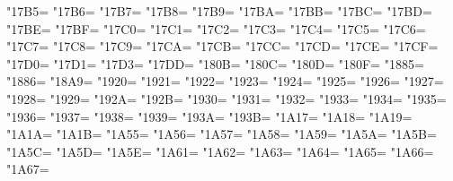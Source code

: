 \XeTeXcharclass"17B5=\KclassCM
\XeTeXcharclass"17B6=\KclassCM
\XeTeXcharclass"17B7=\KclassCM
\XeTeXcharclass"17B8=\KclassCM
\XeTeXcharclass"17B9=\KclassCM
\XeTeXcharclass"17BA=\KclassCM
\XeTeXcharclass"17BB=\KclassCM
\XeTeXcharclass"17BC=\KclassCM
\XeTeXcharclass"17BD=\KclassCM
\XeTeXcharclass"17BE=\KclassCM
\XeTeXcharclass"17BF=\KclassCM
\XeTeXcharclass"17C0=\KclassCM
\XeTeXcharclass"17C1=\KclassCM
\XeTeXcharclass"17C2=\KclassCM
\XeTeXcharclass"17C3=\KclassCM
\XeTeXcharclass"17C4=\KclassCM
\XeTeXcharclass"17C5=\KclassCM
\XeTeXcharclass"17C6=\KclassCM
\XeTeXcharclass"17C7=\KclassCM
\XeTeXcharclass"17C8=\KclassCM
\XeTeXcharclass"17C9=\KclassCM
\XeTeXcharclass"17CA=\KclassCM
\XeTeXcharclass"17CB=\KclassCM
\XeTeXcharclass"17CC=\KclassCM
\XeTeXcharclass"17CD=\KclassCM
\XeTeXcharclass"17CE=\KclassCM
\XeTeXcharclass"17CF=\KclassCM
\XeTeXcharclass"17D0=\KclassCM
\XeTeXcharclass"17D1=\KclassCM
\XeTeXcharclass"17D3=\KclassCM
\XeTeXcharclass"17DD=\KclassCM
\XeTeXcharclass"180B=\KclassCM
\XeTeXcharclass"180C=\KclassCM
\XeTeXcharclass"180D=\KclassCM
\XeTeXcharclass"180F=\KclassCM
\XeTeXcharclass"1885=\KclassCM
\XeTeXcharclass"1886=\KclassCM
\XeTeXcharclass"18A9=\KclassCM
\XeTeXcharclass"1920=\KclassCM
\XeTeXcharclass"1921=\KclassCM
\XeTeXcharclass"1922=\KclassCM
\XeTeXcharclass"1923=\KclassCM
\XeTeXcharclass"1924=\KclassCM
\XeTeXcharclass"1925=\KclassCM
\XeTeXcharclass"1926=\KclassCM
\XeTeXcharclass"1927=\KclassCM
\XeTeXcharclass"1928=\KclassCM
\XeTeXcharclass"1929=\KclassCM
\XeTeXcharclass"192A=\KclassCM
\XeTeXcharclass"192B=\KclassCM
\XeTeXcharclass"1930=\KclassCM
\XeTeXcharclass"1931=\KclassCM
\XeTeXcharclass"1932=\KclassCM
\XeTeXcharclass"1933=\KclassCM
\XeTeXcharclass"1934=\KclassCM
\XeTeXcharclass"1935=\KclassCM
\XeTeXcharclass"1936=\KclassCM
\XeTeXcharclass"1937=\KclassCM
\XeTeXcharclass"1938=\KclassCM
\XeTeXcharclass"1939=\KclassCM
\XeTeXcharclass"193A=\KclassCM
\XeTeXcharclass"193B=\KclassCM
\XeTeXcharclass"1A17=\KclassCM
\XeTeXcharclass"1A18=\KclassCM
\XeTeXcharclass"1A19=\KclassCM
\XeTeXcharclass"1A1A=\KclassCM
\XeTeXcharclass"1A1B=\KclassCM
\XeTeXcharclass"1A55=\KclassCM
\XeTeXcharclass"1A56=\KclassCM
\XeTeXcharclass"1A57=\KclassCM
\XeTeXcharclass"1A58=\KclassCM
\XeTeXcharclass"1A59=\KclassCM
\XeTeXcharclass"1A5A=\KclassCM
\XeTeXcharclass"1A5B=\KclassCM
\XeTeXcharclass"1A5C=\KclassCM
\XeTeXcharclass"1A5D=\KclassCM
\XeTeXcharclass"1A5E=\KclassCM
\XeTeXcharclass"1A61=\KclassCM
\XeTeXcharclass"1A62=\KclassCM
\XeTeXcharclass"1A63=\KclassCM
\XeTeXcharclass"1A64=\KclassCM
\XeTeXcharclass"1A65=\KclassCM
\XeTeXcharclass"1A66=\KclassCM
\XeTeXcharclass"1A67=\KclassCM
